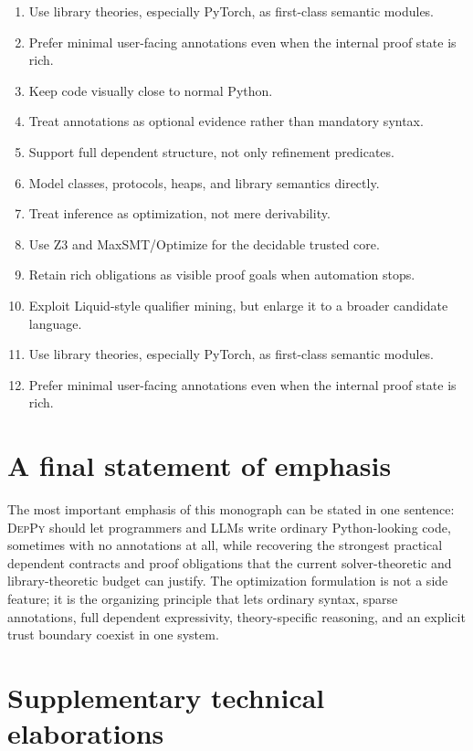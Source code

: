 \documentclass[11pt]{article}
\newcommand{\DepPy}{\textsc{DepPy}}
\newcommand{\Zthree}{\textsc{Z3}}
\theoremstyle{definition}
\theoremstyle{plain}
\begin{document}
\begin{enumerate}[label=\arabic*.]
  \item Use library theories, especially PyTorch, as first-class semantic modules.
  \item Prefer minimal user-facing annotations even when the internal proof state is rich.
  \item Keep code visually close to normal Python.
  \item Treat annotations as optional evidence rather than mandatory syntax.
  \item Support full dependent structure, not only refinement predicates.
  \item Model classes, protocols, heaps, and library semantics directly.
  \item Treat inference as optimization, not mere derivability.
  \item Use \Zthree{} and MaxSMT/Optimize for the decidable trusted core.
  \item Retain rich obligations as visible proof goals when automation stops.
  \item Exploit Liquid-style qualifier mining, but enlarge it to a broader candidate language.
  \item Use library theories, especially PyTorch, as first-class semantic modules.
  \item Prefer minimal user-facing annotations even when the internal proof state is rich.
\end{enumerate}

\section{A final statement of emphasis}
The most important emphasis of this monograph can be stated in one sentence:
\DepPy{} should let programmers and LLMs write ordinary Python-looking code,
sometimes with no annotations at all, while recovering the strongest practical
dependent contracts and proof obligations that the current solver-theoretic and
library-theoretic budget can justify. The optimization formulation is not a
side feature; it is the organizing principle that lets ordinary syntax, sparse
annotations, full dependent expressivity, theory-specific reasoning, and an
explicit trust boundary coexist in one system.
\section{Supplementary technical elaborations}
\end{document}
